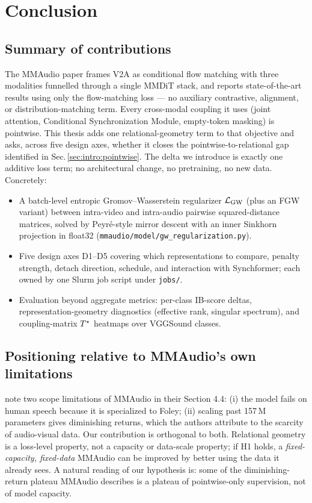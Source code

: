 \section{Conclusion}
\label{sec:conclusion}

\subsection{Summary of contributions}
The MMAudio paper \citep{cheng2024mmaudio} frames V2A as
conditional flow matching with three modalities funnelled through
a single MMDiT stack, and reports state-of-the-art results using
only the flow-matching loss --- no auxiliary contrastive,
alignment, or distribution-matching term. Every cross-modal
coupling it uses (joint attention, Conditional Synchronization
Module, empty-token masking) is pointwise. This thesis adds one
relational-geometry term to that objective and asks, across five
design axes, whether it closes the pointwise-to-relational gap
identified in Sec.\,\ref{sec:intro:pointwise}. The delta we
introduce is exactly one additive loss term; no architectural
change, no pretraining, no new data. Concretely:
\begin{itemize}[leftmargin=*,topsep=2pt]
  \item A batch-level entropic Gromov--Wasserstein regularizer
    $\mathcal{L}_{\mathrm{GW}}$ (plus an FGW variant) between intra-video and
    intra-audio pairwise squared-distance matrices, solved by
    Peyr\'e-style mirror descent with an inner Sinkhorn
    projection in float32
    (\texttt{mmaudio/model/gw\_regularization.py}).
  \item Five design axes D1--D5 covering which representations to
    compare, penalty strength, detach direction, schedule, and
    interaction with Synchformer; each owned by one Slurm job
    script under \texttt{jobs/}.
  \item Evaluation beyond aggregate metrics: per-class IB-score
    deltas, representation-geometry diagnostics (effective rank,
    singular spectrum), and coupling-matrix $T^{\star}$ heatmaps
    over VGGSound classes.
\end{itemize}

\subsection{Positioning relative to MMAudio's own limitations}
\citet{cheng2024mmaudio} note two scope limitations of MMAudio
in their Section 4.4: (i) the model fails on human speech
because it is specialized to Foley; (ii) scaling past 157\,M
parameters gives diminishing returns, which the authors
attribute to the scarcity of audio-visual data. Our contribution
is orthogonal to both. Relational geometry is a loss-level
property, not a capacity or data-scale property; if H1 holds, a
\emph{fixed-capacity, fixed-data} MMAudio can be improved by
better using the data it already sees. A natural reading of our
hypothesis is: some of the diminishing-return plateau MMAudio
describes is a plateau of pointwise-only supervision, not of
model capacity.

